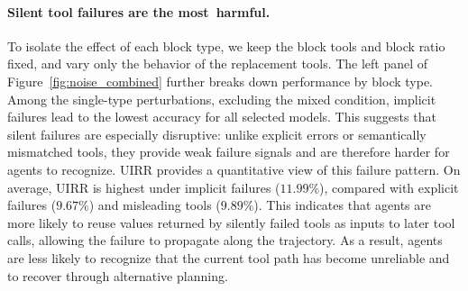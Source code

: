 \documentclass{llmxive}
\begin{document}


\paragraph{Silent tool failures are the most~harmful.}
To isolate the effect of each block type, we keep the block tools and block ratio fixed, and vary only the behavior of the replacement tools. 
The left panel of Figure~\ref{fig:noise_combined} further breaks down performance by block type. 
Among the single-type perturbations, excluding the mixed condition, implicit failures lead to the lowest accuracy for all selected models. 
This suggests that silent failures are especially disruptive: unlike explicit errors or semantically mismatched tools, they provide weak failure signals and are therefore harder for agents to recognize.
UIRR provides a quantitative view of this failure pattern.
On average, UIRR is highest under implicit failures ($11.99\%$), compared with explicit failures ($9.67\%$) and misleading tools ($9.89\%$).
This indicates that agents are more likely to reuse values returned by silently failed tools as inputs to later tool calls, allowing the failure to propagate along the trajectory.
As a result, agents are less likely to recognize that the current tool path has become unreliable and to recover through alternative planning.
\end{document}
